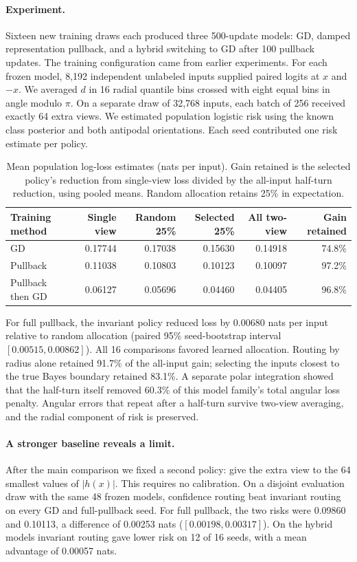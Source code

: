 \paragraph{Experiment.}
Sixteen new training draws each produced three 500-update models: GD, damped representation pullback, and a hybrid switching to GD after 100 pullback updates. The training configuration came from earlier experiments. For each frozen model, 8,192 independent unlabeled inputs supplied paired logits at $x$ and $-x$. We averaged $d$ in 16 radial quantile bins crossed with eight equal bins in angle modulo $\pi$. On a separate draw of 32,768 inputs, each batch of 256 received exactly 64 extra views. We estimated population logistic risk using the known class posterior and both antipodal orientations. Each seed contributed one risk estimate per policy.

\begin{table}[ht]
\centering
\begin{tabular}{lrrrrr}
\toprule
Training method & Single view & Random 25\% & Selected 25\% & All two-view & Gain retained\\
\midrule
GD & 0.17744 & 0.17038 & 0.15630 & 0.14918 & 74.8\%\\
Pullback & 0.11038 & 0.10803 & 0.10123 & 0.10097 & 97.2\%\\
Pullback then GD & 0.06127 & 0.05696 & 0.04460 & 0.04405 & 96.8\%\\
\bottomrule
\end{tabular}
\caption{Mean population log-loss estimates (nats per input). Gain retained is the selected policy's reduction from single-view loss divided by the all-input half-turn reduction, using pooled means. Random allocation retains 25\% in expectation.}
\end{table}

For full pullback, the invariant policy reduced loss by 0.00680 nats per input relative to random allocation (paired 95\% seed-bootstrap interval $[0.00515,0.00862]$). All 16 comparisons favored learned allocation. Routing by radius alone retained 91.7\% of the all-input gain; selecting the inputs closest to the true Bayes boundary retained 83.1\%. A separate polar integration showed that the half-turn itself removed 60.3\% of this model family's total angular loss penalty. Angular errors that repeat after a half-turn survive two-view averaging, and the radial component of risk is preserved.

\paragraph{A stronger baseline reveals a limit.}
After the main comparison we fixed a second policy: give the extra view to the 64 smallest values of $|h(x)|$. This requires no calibration. On a disjoint evaluation draw with the same 48 frozen models, confidence routing beat invariant routing on every GD and full-pullback seed. For full pullback, the two risks were 0.09860 and 0.10113, a difference of 0.00253 nats ($[0.00198,0.00317]$). On the hybrid models invariant routing gave lower risk on 12 of 16 seeds, with a mean advantage of 0.00057 nats.

